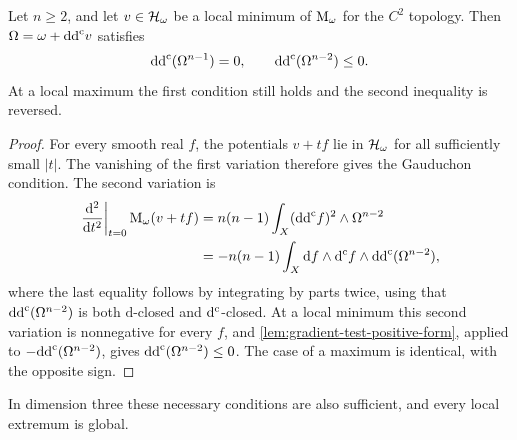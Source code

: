\begin{proposition}\label{prop:local-mass-extremum-necessary}
Let $n\geq2$, and let $v\in\mathcal H_\omega$ be a local minimum of $\mathrm M_\omega$ for the $C^2$ topology. Then $\Omega=\omega+\mathrm{dd}^{\mathrm{c}} v$ satisfies
\[
 \mathrm{dd}^{\mathrm{c}}(\Omega^{n-1})=0,
 \qquad \mathrm{dd}^{\mathrm{c}}(\Omega^{n-2})\leq0.
\]
At a local maximum the first condition still holds and the second inequality is reversed.
\end{proposition}
\begin{proof}
For every smooth real $f$, the potentials $v+tf$ lie in $\mathcal H_\omega$ for all sufficiently small $|t|$. The vanishing of the first variation therefore gives the Gauduchon condition. The second variation is
\[
 \begin{aligned}
 \left.\frac{\mathrm{d}^2}{\mathrm{d}t^2}\right|_{t=0}\mathrm M_\omega(v+tf)
 &=n(n-1)\int_X(\mathrm{dd}^{\mathrm{c}} f)^2\wedge\Omega^{n-2}\\
 &=-n(n-1)\int_X\mathrm{d}f\wedge\mathrm d^{\mathrm c} f\wedge\mathrm{dd}^{\mathrm{c}}(\Omega^{n-2}),
 \end{aligned}
\]
where the last equality follows by integrating by parts twice, using that $\mathrm{dd}^{\mathrm{c}}(\Omega^{n-2})$ is both $\mathrm{d}$-closed and $\mathrm d^{\mathrm c}$-closed. At a local minimum this second variation is nonnegative for every $f$, and \cref{lem:gradient-test-positive-form}, applied to $-\mathrm{dd}^{\mathrm{c}}(\Omega^{n-2})$, gives $\mathrm{dd}^{\mathrm{c}}(\Omega^{n-2})\leq0$. The case of a maximum is identical, with the opposite sign.
\end{proof}

In dimension three these necessary conditions are also sufficient, and every local extremum is global.


